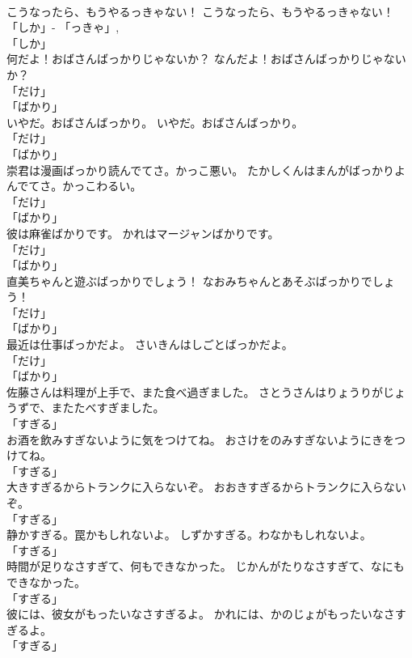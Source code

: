 \documentclass[8pt]{extreport}
\begin{document}
\begin{CJK}{UTF8}{min}
\\	こうなったら、もうやるっきゃない！	こうなったら、もうやるっきゃない！	
\\	「しか」- 「っきゃ」, 
\\	「しか」	
\\	何だよ！おばさんばっかりじゃないか？	なんだよ！おばさんばっかりじゃないか？	
\\	「だけ」 
\\	「ばかり」	
\\	いやだ。おばさんばっかり。	いやだ。おばさんばっかり。	
\\	「だけ」 
\\	「ばかり」	
\\	崇君は漫画ばっかり読んでてさ。かっこ悪い。	たかしくんはまんがばっかりよんでてさ。かっこわるい。	
\\	「だけ」 
\\	「ばかり」	
\\	彼は麻雀ばかりです。	かれはマージャンばかりです。	
\\	「だけ」 
\\	「ばかり」	
\\	直美ちゃんと遊ぶばっかりでしょう！	なおみちゃんとあそぶばっかりでしょう！	
\\	「だけ」 
\\	「ばかり」	
\\	最近は仕事ばっかだよ。	さいきんはしごとばっかだよ。	
\\	「だけ」 
\\	「ばかり」	
\\	佐藤さんは料理が上手で、また食べ過ぎました。	さとうさんはりょうりがじょうずで、またたべすぎました。	
\\	「すぎる」	
\\	お酒を飲みすぎないように気をつけてね。	おさけをのみすぎないようにきをつけてね。	
\\	「すぎる」	
\\	大きすぎるからトランクに入らないぞ。	おおきすぎるからトランクに入らないぞ。	
\\	「すぎる」	
\\	静かすぎる。罠かもしれないよ。	しずかすぎる。わなかもしれないよ。	
\\	「すぎる」	
\\	時間が足りなさすぎて、何もできなかった。	じかんがたりなさすぎて、なにもできなかった。	
\\	「すぎる」	
\\	彼には、彼女がもったいなさすぎるよ。	かれには、かのじょがもったいなさすぎるよ。	
\\	「すぎる」	

\end{CJK}
\end{document}

